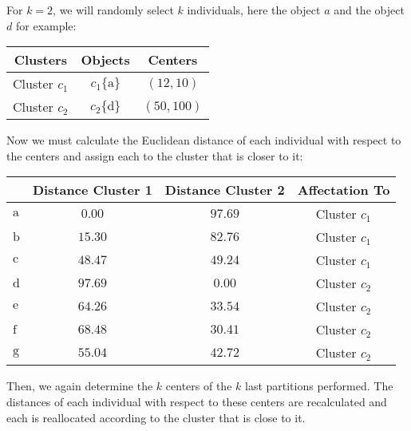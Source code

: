 	For $k = 2$, we will randomly select $k$ individuals, here the object $a$ and the object $d$ for example:
	\begin{table}[H]
		\centering
		\begin{tabular}{|c|c|c|}
		\hline
		\rowcolor[HTML]{9B9B9B} 
		\textbf{Clusters} & \textbf{Objects} & \textbf{Centers} \\ \hline
		Cluster $c_1$ & $c_1\{\mathrm{a}\}$ & $(12,10)$ \\ \hline
		Cluster $c_2$ & $c_2\{\mathrm{d}\}$ & $(50,100)$ \\ \hline
		\end{tabular}
	\end{table}
	Now we must calculate the Euclidean distance of each individual with respect to the centers and assign each to the cluster that is closer to it:
	\begin{table}[H]
		\centering
		\begin{tabular}{|l|c|c|c|}
		\hline
		\rowcolor[HTML]{9B9B9B} 
		\multicolumn{1}{|c|}{\cellcolor[HTML]{9B9B9B}\textbf{Objects}} & \textbf{Distance Cluster 1} & \textbf{Distance Cluster 2} & \textbf{Affectation To} \\ \hline
		$\mathrm{a}$ & $0.00$ & $97.69$ & Cluster $c_1$ \\ \hline
		$\mathrm{b}$ & $15.30$ & $82.76$ & Cluster $c_1$ \\ \hline
		$\mathrm{c}$ & $48.47$ & $49.24$ & Cluster $c_1$ \\ \hline
		$\mathrm{d}$ & $97.69$ & $0.00$ & Cluster $c_2$ \\ \hline
		$\mathrm{e}$ & $64.26$ & $33.54$ & Cluster $c_2$ \\ \hline
		$\mathrm{f}$ & $68.48$ & $30.41$ & Cluster $c_2$ \\ \hline
		$\mathrm{g}$ & $55.04$ & $42.72$ & Cluster $c_2$ \\ \hline
		\end{tabular}
	\end{table}
	Then, we again determine the $k$ centers of the $k$ last partitions performed. The distances of each individual with respect to these centers are recalculated and each is reallocated according to the cluster that is close to it.
	
